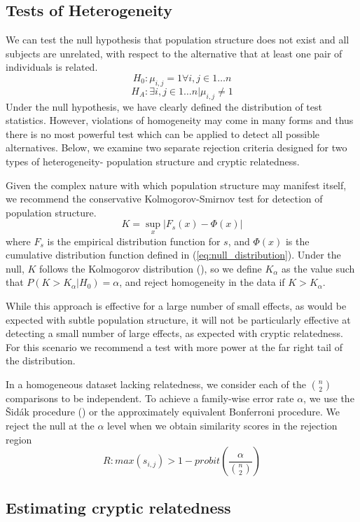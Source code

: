 \subsection{Tests of Heterogeneity}

We can test the null hypothesis that population structure does not
exist and all subjects are unrelated, with respect to the alternative
that at least one pair of individuals is related. 
\[
H_{0}:\mu_{i,j}=1\forall i,j\in1\dots n
\]
\[
H_{A}:\exists i,j\in1\dots n|\mu_{i,j}\ne1
\]
Under the null hypothesis, we have clearly defined the distribution of test statistics.  However, violations of homogeneity may come in many forms and thus there is no most powerful test which can be applied to detect all possible alternatives.  Below, we examine two separate rejection criteria designed for two types of heterogeneity- population structure and cryptic relatedness.

Given the complex nature with which population structure may manifest itself, we recommend the conservative Kolmogorov-Smirnov test for detection of population structure.
\[
K=\sup_{x}\left|F_{s}\left(x\right)-\Phi\left(x\right)\right|
\]
where $F_{s}$ is the empirical distribution function for $s$, and $\Phi\left(x\right)$ is the cumulative distribution function defined in (\ref{eq:null_distribution}). Under the null, $K$ follows the Kolmogorov distribution (\citealp{wang2003evaluating}), so we define $K_{\alpha}$ as the value such that $P\left(K>K_\alpha|H_{0}\right)=\alpha$, and reject homogeneity in the data if $K>K_\alpha$.

While this approach is effective for a large number of small effects, as would be expected with subtle population structure, it will not be particularly effective at detecting a small number of large effects, as expected with cryptic relatedness.  For this scenario we recommend a test with more power at the far right tail of the distribution.  

In a homogeneous dataset lacking relatedness, we consider each of
the ${n \choose 2}$ comparisons to be independent. To achieve a family-wise
error rate $\alpha$, we use the {\v{S}}id{\'a}k procedure (\citealp{vsidak1967rectangular})
or the approximately equivalent Bonferroni procedure. We reject the
null at the $\alpha$ level when we obtain similarity scores in the
rejection region 
\[
R:max\left(s_{i,j}\right)>1-probit\left(\frac{\alpha}{{n \choose 2}}\right)
\]


\subsection{Estimating cryptic relatedness}

